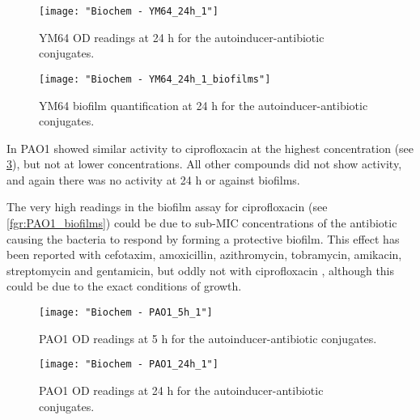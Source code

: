 \begin{figure}[H]
	\begin{center}
		\texttt{[image: "Biochem - YM64\_24h\_1"]}
		\caption{YM64 OD readings at 24 h for the autoinducer-antibiotic conjugates.\label{fgr:YM64_24h}}
	\end{center}
\end{figure}

\begin{figure}[H]
	\begin{center}
		\texttt{[image: "Biochem - YM64\_24h\_1\_biofilms"]}
		\caption{YM64 biofilm quantification at 24 h for the autoinducer-antibiotic conjugates.\label{fgr:YM64_biofilms}}
	\end{center}
\end{figure}


In PAO1  showed similar activity to ciprofloxacin  at the highest concentration (see \ref{fgr:PAO1_5h}), but not at lower concentrations. All other compounds did not show activity, and again there was no activity at 24 h or against biofilms. 

The very high readings in the biofilm assay for ciprofloxacin  (see \ref{fgr:PAO1_biofilms}) could be due to sub-MIC concentrations of the antibiotic causing the bacteria to respond by forming a protective biofilm. This effect has been reported with cefotaxim, amoxicillin, azithromycin\cite{Aka2015,Hoffman2005}, tobramycin, amikacin, streptomycin and gentamicin, but oddly not with ciprofloxacin \cite{Gupta2016,Machado2013}, although this could be due to the exact conditions of growth.

\begin{figure}[H]
	\begin{center}
		\texttt{[image: "Biochem - PAO1\_5h\_1"]}
		\caption{PAO1 OD readings at 5 h for the autoinducer-antibiotic conjugates.\label{fgr:PAO1_5h}}
	\end{center}
\end{figure}

\begin{figure}[H]
	\begin{center}
		\texttt{[image: "Biochem - PAO1\_24h\_1"]}
		\caption{PAO1 OD readings at 24 h for the autoinducer-antibiotic conjugates.\label{fgr:PAO1_24h}}
	\end{center}
\end{figure}

